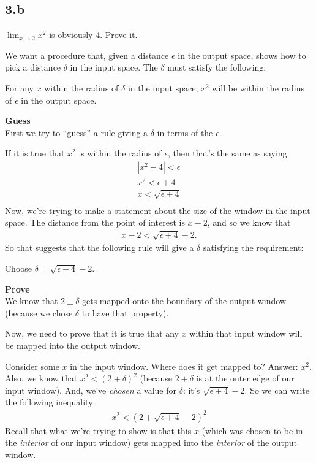\documentclass[12pt]{article}
\begin{document}
\newpage
\subsection*{3.b}
$\lim_{x\to 2} x^2$ is obviously 4. Prove it.\\

\begin{mdframed}
  We want a procedure that, given a distance $\epsilon$ in the output space,
  shows how to pick a distance $\delta$ in the input space. The $\delta$ must satisfy the following:

  For any $x$ within the radius of $\delta$ in the input space, $x^2$ will be
  within the radius of $\epsilon$ in the output space.

  \textbf{Guess}\\
  First we try to ``guess'' a rule giving a $\delta$ in terms of the $\epsilon$.

  If it is true that $x^2$ is within the radius of $\epsilon$, then that's the
  same as saying
  \begin{align*}
    |x^2 - 4| < \epsilon\\
    x^2 < \epsilon + 4\\
    x < \sqrt{\epsilon + 4}\\
  \end{align*}
  Now, we're trying to make a statement about the size of the window in the
  input space. The distance from the point of interest is $x - 2$, and so we
  know that
  \begin{align*}
    x - 2 < \sqrt{\epsilon + 4} - 2.
  \end{align*}
  So that suggests that the following rule will give a $\delta$ satisfying the
  requirement:

  Choose $\delta = \sqrt{\epsilon + 4} - 2$.

  \textbf{Prove}\\
  We know that $2 \pm \delta$ gets mapped onto the boundary of the output
  window (because we chose $\delta$ to have that property).

  Now, we need to prove that it is true that any $x$ within that input window
  will be mapped into the output window.

  Consider some $x$ in the input window. Where does it get mapped to? Answer:
  $x^2$. Also, we know that $x^2 < (2 + \delta)^2$ (because $2+\delta$ is at
  the outer edge of our input window). And, we've \textit{chosen} a value for
  $\delta$: it's $\sqrt{\epsilon + 4} - 2$. So we can write the following
  inequality:
  \begin{align*}
    x^2 < (2 + \sqrt{\epsilon + 4} - 2)^2
  \end{align*}
  Recall that what we're trying to show is that this $x$ (which was chosen to
  be in the \textit{interior} of our input window) gets mapped into the
  \textit{interior} of the output window.


\end{mdframed}
\end{document}
